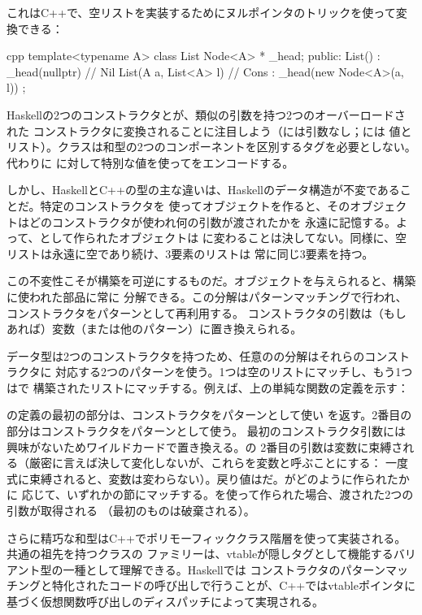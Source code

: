 これはC++で、空リストを実装するためにヌルポインタのトリックを使って変換できる：

\begin{snip}{cpp}
template<typename A>
class List {
    Node<A> * _head;
public:
    List() : _head(nullptr) {} // Nil
    List(A a, List<A> l)       // Cons
      : _head(new Node<A>(a, l))
    {}
};
\end{snip}
Haskellの2つのコンストラクタとが、類似の引数を持つ2つのオーバーロードされた
コンストラクタに変換されることに注目しよう（には引数なし；には
値とリスト）。クラスは和型の2つのコンポーネントを区別するタグを必要としない。代わりに
に対して特別な値を使ってをエンコードする。

しかし、HaskellとC++の型の主な違いは、Haskellのデータ構造が不変であることだ。特定のコンストラクタを
使ってオブジェクトを作ると、そのオブジェクトはどのコンストラクタが使われ何の引数が渡されたかを
永遠に記憶する。よって、として作られたオブジェクトは
に変わることは決してない。同様に、空リストは永遠に空であり続け、3要素のリストは
常に同じ3要素を持つ。

この不変性こそが構築を可逆にするものだ。オブジェクトを与えられると、構築に使われた部品に常に
分解できる。この分解はパターンマッチングで行われ、コンストラクタをパターンとして再利用する。
コンストラクタの引数は（もしあれば）変数（または他のパターン）に置き換えられる。

データ型は2つのコンストラクタを持つため、任意のの分解はそれらのコンストラクタに
対応する2つのパターンを使う。1つは空のリストにマッチし、もう1つはで
構築されたリストにマッチする。例えば、上の単純な関数の定義を示す：

の定義の最初の部分は、コンストラクタをパターンとして使い
を返す。2番目の部分はコンストラクタをパターンとして使う。
最初のコンストラクタ引数には興味がないためワイルドカードで置き換える。の
2番目の引数は変数に束縛される（厳密に言えば決して変化しないが、これらを変数と呼ぶことにする：
一度式に束縛されると、変数は変わらない）。戻り値はだ。がどのように作られたかに
応じて、いずれかの節にマッチする。を使って作られた場合、渡された2つの引数が取得される
（最初のものは破棄される）。

さらに精巧な和型はC++でポリモーフィッククラス階層を使って実装される。共通の祖先を持つクラスの
ファミリーは、vtableが隠しタグとして機能するバリアント型の一種として理解できる。Haskellでは
コンストラクタのパターンマッチングと特化されたコードの呼び出しで行うことが、C++ではvtableポインタに
基づく仮想関数呼び出しのディスパッチによって実現される。

